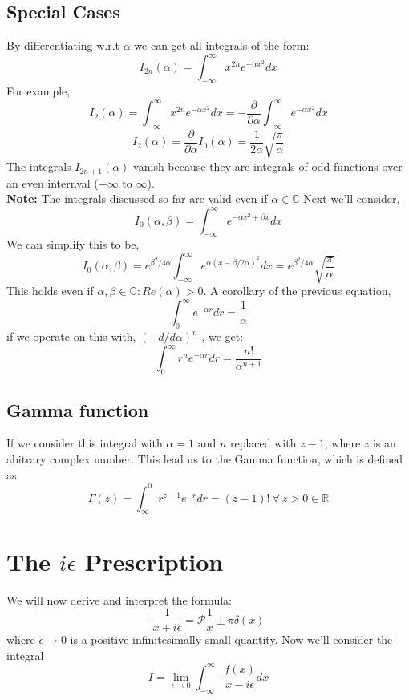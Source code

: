\subsection{Special Cases}
By differentiating w.r.t $\alpha$ we can get all integrals of the form:
\begin{equation}
I_{2n} (\alpha) = \int_{-\infty}^{\infty} x^{2n} e^{-\alpha x^{2}} dx
\end{equation}
For example,
$$I_{2}(\alpha) = \int_{-\infty}^{\infty} x^{2n} e^{-\alpha x^{2}} dx = -\frac{\partial }{\partial \alpha} \int_{-\infty}^{\infty} e^{-\alpha x^{2}} dx$$
$$I_{2}(\alpha) = \frac{\partial }{\partial \alpha} I_{0}(\alpha) = \frac{1}{2 \alpha} \sqrt{\frac{\pi}{\alpha}}$$
The integrals $I_{2n+1}(\alpha)$ vanish because they are integrals of odd functions over an even internval ($-\infty \text{ to } \infty$).
\\ \textbf{Note:} The integrals discussed so far are valid even if $\alpha \in \mathbb{C}$
Next we'll consider,
\begin{equation}
I_{0}(\alpha, \beta) = \int_{- \infty}^{\infty} e^{-\alpha x^{2} + \beta x} dx
\end{equation}
We can simplify this to be,
$$I_{0}(\alpha, \beta) = e^{\beta^{2}/ 4 \alpha} \int_{- \infty}^{\infty} e^{\alpha{(x - \beta / 2 \alpha)}^{2}} dx = e^{\beta^{2}/ 4 \alpha} \sqrt{\frac{\pi}{\alpha}}$$
This holds even if $\alpha, \beta \in \mathbb{C} : Re(\alpha) > 0$. A corollary of the previous equation,
$$\int_{0}^{\infty} e^{-\alpha r} dr = \frac{1}{\alpha}$$
if we operate on this with, ${(-d/d \alpha)}^{n}$ , we get:
$$\int_{0}^{\infty} r^{n} e^{-\alpha r} dr = \frac{n!}{\alpha^{n+1}}$$
\subsection{Gamma function}
If we consider this integral with $\alpha = 1$ and $n$ replaced with $z-1$, where $z$ is an abitrary complex number. This lead us to the Gamma function, which is defined as:
\begin{equation}
\Gamma (z) = \int^{0}_{\infty} r^{z-1} e^{-r} dr = (z-1)! \ \forall \ z > 0 \in \mathbb{R}
\end{equation}
\section{The $i \epsilon$ Prescription}
We will now derive and interpret the formula:
\begin{equation}
\frac{1}{x \mp i \epsilon} = \mathscr{P} \frac{1}{x} \pm \pi \delta (x)
\end{equation}
where $\epsilon \rightarrow 0$ is a positive infinitesimally small quantity. Now we'll consider the integral
\begin{equation}
	I = \lim_{\epsilon \rightarrow 0} \int_{- \infty}^{\infty} \frac{f(x)}{x - i \epsilon} dx
\end{equation}

